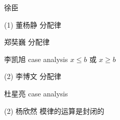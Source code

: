 \begin{frame}{}
  徐臣
\end{frame}

\begin{frame}{(1)}
  董杨静 分配律

  郑奘巍 分配律

  李凯旭 case analysis $x \le b$ 或 $x \ge b$
\end{frame}

\begin{frame}{(2)}
  李博文 分配律

  杜星亮 case analysis
\end{frame}

\begin{frame}{(2)}
  杨欣然 模律的运算是封闭的
\end{frame}


